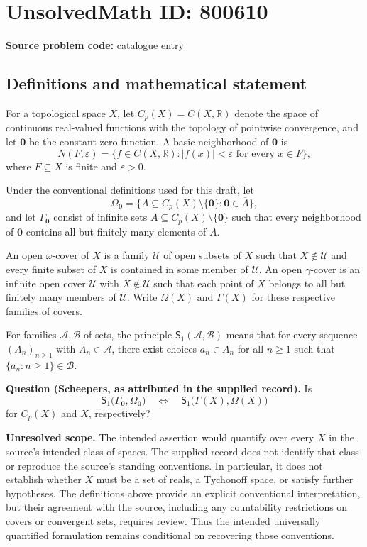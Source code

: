 \documentclass[11pt]{article}
\newcommand{\R}{\mathbb{R}}
\begin{document}
\section*{UnsolvedMath ID: 800610}
\textbf{Source problem code:} catalogue entry
\subsection{Definitions and mathematical statement}
For a topological space \(X\), let \(C_p(X)=C(X,\R)\) denote the space of continuous real-valued functions with the topology of pointwise convergence, and let \(\mathbf 0\) be the constant zero function. A basic neighborhood of \(\mathbf 0\) is
\[
N(F,\varepsilon)=\{f\in C(X,\R): |f(x)|<\varepsilon\text{ for every }x\in F\},
\]
where \(F\subseteq X\) is finite and \(\varepsilon>0\).

Under the conventional definitions used for this draft, let
\[
\Omega_{\mathbf 0}=\{A\subseteq C_p(X)\setminus\{\mathbf 0\}:\mathbf 0\in\overline A\},
\]
and let \(\Gamma_{\mathbf 0}\) consist of infinite sets \(A\subseteq C_p(X)\setminus\{\mathbf 0\}\) such that every neighborhood of \(\mathbf 0\) contains all but finitely many elements of \(A\).

An open \(\omega\)-cover of \(X\) is a family \(\mathcal U\) of open subsets of \(X\) such that \(X\notin\mathcal U\) and every finite subset of \(X\) is contained in some member of \(\mathcal U\). An open \(\gamma\)-cover is an infinite open cover \(\mathcal U\) with \(X\notin\mathcal U\) such that each point of \(X\) belongs to all but finitely many members of \(\mathcal U\). Write \(\Omega(X)\) and \(\Gamma(X)\) for these respective families of covers.

For families \(\mathcal A,\mathcal B\) of sets, the principle \(\mathsf S_1(\mathcal A,\mathcal B)\) means that for every sequence \((A_n)_{n\geq 1}\) with \(A_n\in\mathcal A\), there exist choices \(a_n\in A_n\) for all \(n\geq 1\) such that \(\{a_n:n\geq 1\}\in\mathcal B\).

\textbf{Question (Scheepers, as attributed in the supplied record).} Is
\[
\mathsf S_1\bigl(\Gamma_{\mathbf 0},\Omega_{\mathbf 0}\bigr)
\quad\Longleftrightarrow\quad
\mathsf S_1\bigl(\Gamma(X),\Omega(X)\bigr)
\]
for \(C_p(X)\) and \(X\), respectively?

\textbf{Unresolved scope.} The intended assertion would quantify over every \(X\) in the source's intended class of spaces. The supplied record does not identify that class or reproduce the source's standing conventions. In particular, it does not establish whether \(X\) must be a set of reals, a Tychonoff space, or satisfy further hypotheses. The definitions above provide an explicit conventional interpretation, but their agreement with the source, including any countability restrictions on covers or convergent sets, requires review. Thus the intended universally quantified formulation remains conditional on recovering those conventions.
\end{document}
